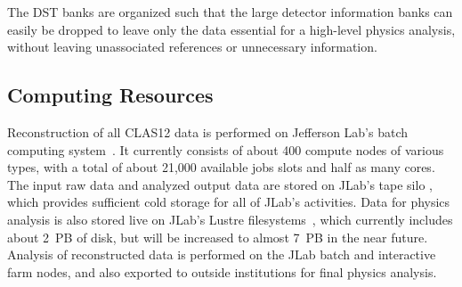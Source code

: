 \noindent
The DST banks are organized such that the large detector information banks can easily be dropped to leave only
the data essential for a high-level physics analysis, without leaving unassociated references or unnecessary information.

\subsection{Computing Resources}

Reconstruction of all CLAS12 data is performed on Jefferson Lab's batch computing system~\cite{jlab-batch-farm}.
It currently consists of about 400 compute nodes of various types, with a total of about 21,000 available jobs
slots and half as many cores.  The input raw data and analyzed output data are stored on JLab's tape silo
\cite{jlab-tape-silo}, which provides sufficient cold storage for all of JLab's activities.  Data for physics analysis is
also stored live on JLab's Lustre filesystems~\cite{jlab-lustre}, which currently includes about 2~PB of disk, but will
be increased to almost 7~PB in the near future. Analysis of reconstructed data is performed on the JLab batch and
interactive farm nodes, and also exported to outside institutions for final physics analysis.
